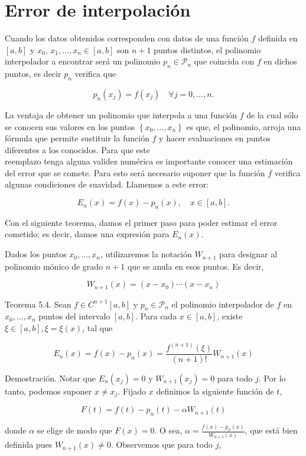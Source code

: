 \documentclass[10pt]{book}
\begin{document}
\section{Error de interpolación}
Cuando los datos obtenidos corresponden con datos de una función $f$ definida en $[a, b]$ y $x_{0}$, $x_{1}, \ldots, x_{n} \in[a, b]$ son $n+1$ puntos distintos, el polinomio interpolador a encontrar será un polinomio $p_{n} \in \mathcal{P}_{n}$ que coincida con $f$ en dichos puntos, es decir $p_{n}$ verifica que

$$
p_{n}\left(x_{j}\right)=f\left(x_{j}\right) \quad \forall j=0, \ldots, n .
$$

La ventaja de obtener un polinomio que interpola a una función $f$ de la cual sólo se conocen sus valores en los puntos $\left\{x_{0}, \ldots, x_{n}\right\}$ es que, el polinomio, arroja una fórmula que permite sustituir la función $f$ y hacer evaluaciones en puntos diferentes a los conocidos. Para que este\\
reemplazo tenga alguna validez numérica es importante conocer una estimación del error que se comete. Para esto será necesario suponer que la función $f$ verifica algunas condiciones de suavidad. Llamemos a este error:

$$
E_{n}(x)=f(x)-p_{n}(x), \quad x \in[a, b] .
$$

Con el siguiente teorema, damos el primer paso para poder estimar el error cometido; es decir, damos una expresión para $E_{n}(x)$.

Dados los puntos $x_{0}, \ldots, x_{n}$, utilizaremos la notación $W_{n+1}$ para designar al polinomio mónico de grado $n+1$ que se anula en esos puntos. Es decir,

$$
W_{n+1}(x)=\left(x-x_{0}\right) \cdots\left(x-x_{n}\right)
$$

Teorema 5.4. Sean $f \in C^{n+1}[a, b]$ y $p_{n} \in \mathcal{P}_{n}$ el polinomio interpolador de $f$ en $x_{0}, \ldots, x_{n}$ puntos del intervalo $[a, b]$. Para cada $x \in[a, b]$, existe $\xi \in[a, b], \xi=\xi(x)$, tal que

$$
E_{n}(x)=f(x)-p_{n}(x)=\frac{f^{(n+1)}(\xi)}{(n+1)!} W_{n+1}(x)
$$

Demostración. Notar que $E_{n}\left(x_{j}\right)=0$ y $W_{n+1}\left(x_{j}\right)=0$ para todo $j$. Por lo tanto, podemos suponer $x \neq x_{j}$. Fijado $x$ definimos la siguiente función de $t$,

$$
F(t)=f(t)-p_{n}(t)-\alpha W_{n+1}(t)
$$

donde $\alpha$ se elige de modo que $F(x)=0$. O sea, $\alpha=\frac{f(x)-p_{n}(x)}{W_{n+1}(x)}$, que está bien definida pues $W_{n+1}(x) \neq 0$. Observemos que para todo $j$,
\end{document}
